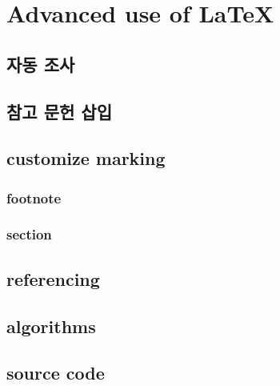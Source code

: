 \documentclass[12pt]{article}
\begin{document}
	\section{Advanced use of \LaTeX}
	\subsection{자동 조사}
	\subsection{참고 문헌 삽입}
	\subsection{customize marking}
	\subsubsection{footnote}
	\subsubsection{section}
	\subsection{referencing}
	\subsection{algorithms}
	\subsection{source code}
\end{document}

